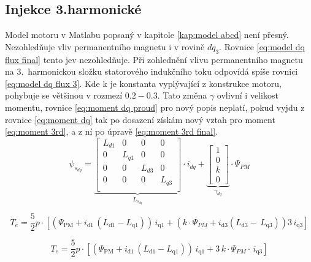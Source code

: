 \subsection{Injekce 3.harmonické}
Model motoru v Matlabu popsaný v kapitole \ref{kap:model abcd} není přesný. Nezohledňuje vliv permanentního magnetu i v rovině $dq_3$. Rovnice \ref{eq:model dq flux final} tento jev nezohledňuje. Při zohlednění vlivu permanentního magnetu na 3.~harmonickou složku statorového indukčního toku odpovídá spíše rovnici \ref{eq:model dq flux 3}. Kde k je konstanta vyplývající z konstrukce motoru, pohybuje se většinou v rozmezí $0.2-0.3$. Tato změna $\gamma$ ovlivní i velikost momentu, rovnice \ref{eq:moment dq proud} pro nový popis neplatí, pokud vyjdu z rovnice \ref{eq:moment dq} tak po dosazení získám nový vztah pro moment \ref{eq:moment 3rd}, a z ní po úpravě \ref{eq:moment 3rd final}.
\begin{equation}
    \label{eq:model dq flux 3}
    \psi_{s_{dq}}=
    \underbrace{
     \begin{bmatrix}    
        L_{d1} &0&0&0\\
        0 &L_{q1}&0&0\\
        0 &0&L_{d3}&0\\
        0 &0&0&L_{q3}\\
    \end{bmatrix}}_{L_{s_{dq}}}
    \cdot i_{dq}+ 
    \underbrace{
    \begin{bmatrix}
        1 \\ 0 \\k \\0 
    \end{bmatrix}}_{\gamma_{dq}} \cdot \Psi_{PM}
\end{equation}


\begin{equation}
    \label{eq:moment 3rd}
         T_e = \frac{5}{2} p \cdot \left[
     \left(\Psi _{\mathrm{PM}}+i_{\mathrm{d1}}\,\left(L_{\mathrm{d1}}-L_{\mathrm{q1}}\right)\right)\,i_{\mathrm{q1}}+
     \left( k\cdot \Psi_{PM}+ i_{\mathrm{d3}} \left(L_{\mathrm{d3}}-\,L_{\mathrm{q3}}\right)\right)3\,i_{\mathrm{q3}}\right]
\end{equation}

\begin{equation}
    \label{eq:moment 3rd final}
       T_e = \frac{5}{2} p \cdot \left[
     \left(\Psi _{\mathrm{PM}}+i_{\mathrm{d1}}\,\left(L_{\mathrm{d1}}-L_{\mathrm{q1}}\right)\right)\,i_{\mathrm{q1}}+
     3\,k\cdot \Psi_{PM}\cdot\,i_{\mathrm{q3}}\right]
\end{equation}

